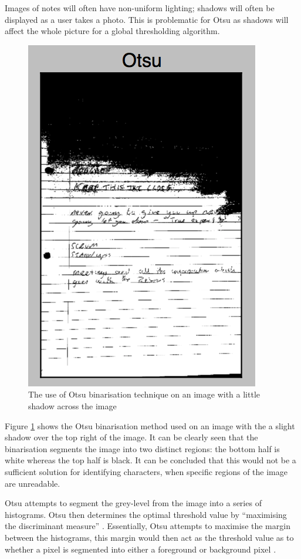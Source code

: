 Images of notes will often have non-uniform lighting; shadows will often be displayed as a user takes a photo. This is problematic for Otsu as shadows will affect the whole picture for a global thresholding algorithm.

\begin{figure}[H]
  \centering
  \includegraphics{images/OTSU}
  \caption{The use of Otsu binarisation technique on an image with a little shadow across the image}
  \label{fig:OTSU}
\end{figure}

Figure \ref{fig:OTSU} shows the Otsu binarisation method used on an image with the a slight shadow over the top right of the image. It can be clearly seen that the binarisation segments the image into two distinct regions: the bottom half is white whereas the top half is black. It can be concluded that this would not be a sufficient solution for identifying characters, when specific regions of the image are unreadable.

Otsu attempts to segment the grey-level from the image into a series of histograms. Otsu then determines the optimal threshold value by ``maximising the discriminant measure'' \cite{citeulike:2917492}. Essentially, Otsu attempts to maximise the margin between the histograms, this margin would then act as the threshold value as to whether a pixel is segmented into either a foreground or background pixel \cite{citeulike:14021372}.


